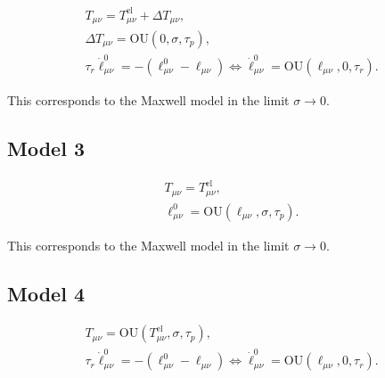 \documentclass{revtex-custom}
\begin{document}
\begin{subequations}
\begin{align}
T_{\mu\nu} = T_{\mu\nu}^{\mathrm{el}} + \Delta T_{\mu\nu},\\
\Delta T_{\mu\nu} = \mathrm{OU}(0, \sigma, \tau_p),\\
\tau_r \dot{\ell}^0_{\mu\nu} = -(\ell^0_{\mu\nu} - \ell_{\mu\nu}) \Leftrightarrow \dot{\ell}^0_{\mu\nu} = \mathrm{OU}(\ell_{\mu\nu}, 0, \tau_r).
\end{align}
\end{subequations}

This corresponds to the Maxwell model in the limit $\sigma \to 0$.

\subsection{Model 3}

\begin{subequations}
\begin{align}
T_{\mu\nu} = T_{\mu\nu}^{\mathrm{el}},\\
\ell^0_{\mu\nu} = \mathrm{OU}(\ell_{\mu\nu}, \sigma, \tau_p).
\end{align}
\end{subequations}

This corresponds to the Maxwell model in the limit $\sigma \to 0$.

\subsection{Model 4}

\begin{subequations}
\begin{align}
T_{\mu\nu} = \mathrm{OU}(T_{\mu\nu}^{\mathrm{el}}, \sigma, \tau_p),\\
\tau_r \dot{\ell}^0_{\mu\nu} = -(\ell^0_{\mu\nu} - \ell_{\mu\nu}) \Leftrightarrow \dot{\ell}^0_{\mu\nu} = \mathrm{OU}(\ell_{\mu\nu}, 0, \tau_r).
\end{align}
\end{subequations}
\end{document}
